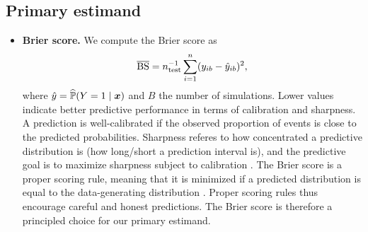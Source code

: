\documentclass[a4paper, 11pt]{article}\usepackage[]{graphicx}\usepackage[]{color}
\begin{document}
\subsection{Primary estimand}

\begin{itemize}
  \item \textbf{Brier score.} We compute the Brier score as
  $$\operatorname{\overline{BS}} = n_{\text{test}}^{-1} \sum_{i=1}^n (y_{ib} - \hat{y}_{ib})^2,$$
  where $\hat{y} = \widehat{\mathbb{P}}(Y = 1 \mid \text{\boldmath$x$})$ and $B$ the number of simulations.
  Lower values indicate better predictive performance in terms of calibration and
  sharpness. A prediction is well-calibrated if the observed proportion
  of events is close to the predicted probabilities. Sharpness referes to how
  concentrated a predictive distribution is (\eg how long/short a prediction interval is),
  and the predictive goal is to maximize sharpness subject to calibration
  \citep{Gneiting2008}.
  The Brier score is a proper scoring rule, meaning that it is minimized if a
  predicted distribution is equal to the data-generating distribution
  \citep{Gneiting2007}. Proper scoring rules thus encourage careful and honest
  predictions. The Brier score is therefore a principled choice for our primary estimand.
\end{itemize}
\end{document}
